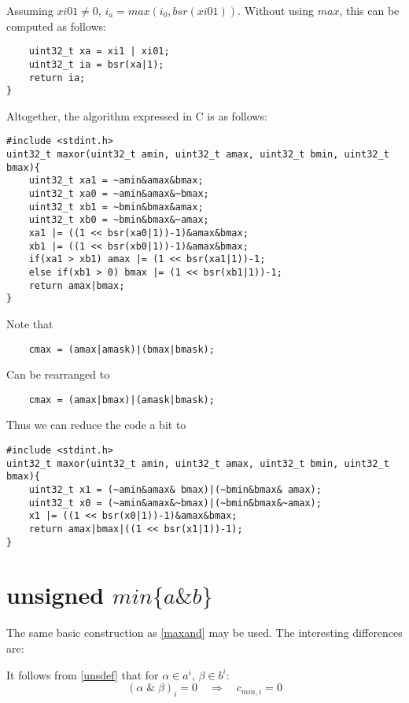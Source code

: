 \documentclass{article}
\begin{document}
Assuming $xi01 \ne 0$, $i_a = max(i_0, bsr(xi01))$. Without using $max$,
this can be computed as follows:
\begin{lstlisting}
    uint32_t xa = xi1 | xi01;
    uint32_t ia = bsr(xa|1);
    return ia;
}
\end{lstlisting}

Altogether, the algorithm expressed in C is as follows:
\begin{lstlisting}
#include <stdint.h>
uint32_t maxor(uint32_t amin, uint32_t amax, uint32_t bmin, uint32_t bmax){
    uint32_t xa1 = ~amin&amax&bmax;
    uint32_t xa0 = ~amin&amax&~bmax;
    uint32_t xb1 = ~bmin&bmax&amax;
    uint32_t xb0 = ~bmin&bmax&~amax;
    xa1 |= ((1 << bsr(xa0|1))-1)&amax&bmax;
    xb1 |= ((1 << bsr(xb0|1))-1)&amax&bmax;
    if(xa1 > xb1) amax |= (1 << bsr(xa1|1))-1;
    else if(xb1 > 0) bmax |= (1 << bsr(xb1|1))-1;
    return amax|bmax;
}
\end{lstlisting}

Note that 

\begin{lstlisting}
    cmax = (amax|amask)|(bmax|bmask);
\end{lstlisting}

Can be rearranged to

\begin{lstlisting}
    cmax = (amax|bmax)|(amask|bmask);
\end{lstlisting}

Thus we can reduce the code a bit to
\begin{lstlisting}
#include <stdint.h>
uint32_t maxor(uint32_t amin, uint32_t amax, uint32_t bmin, uint32_t bmax){
    uint32_t x1 = (~amin&amax& bmax)|(~bmin&bmax& amax);
    uint32_t x0 = (~amin&amax&~bmax)|(~bmin&bmax&~amax);
    x1 |= ((1 << bsr(x0|1))-1)&amax&bmax;
    return amax|bmax|((1 << bsr(x1|1))-1);
}
\end{lstlisting}


\section{unsigned $min \{a\&b\}$}

The same basic construction as \ref{maxand} may be used. 
The interesting differences are:

It follows from \eqref{unsdef} that for $\alpha \in a^i$, $\beta \in b^i$:
\begin{equation}
(\alpha \; \text{\&} \; \beta)_i = 0
\quad \Rightarrow \quad c_{min,i} = 0
\end{equation}
\end{document}
